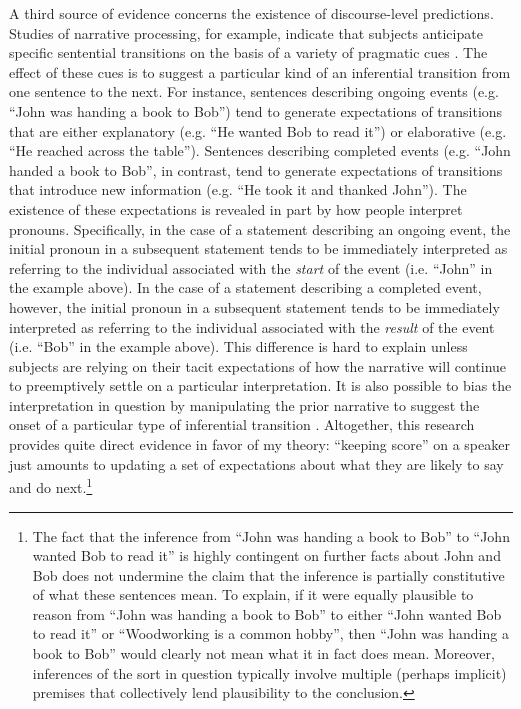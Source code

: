 A third source of evidence concerns the existence of discourse-level predictions. Studies of narrative processing, for example, indicate that subjects anticipate specific sentential transitions on the basis of a variety of pragmatic cues \citep{Rohde:2008}. The effect of these cues is to suggest a particular kind of an inferential transition from one sentence to the next. For instance, sentences describing ongoing events (e.g. ``John was handing a book to Bob'') tend to generate expectations of transitions that are either explanatory (e.g. ``He wanted Bob to read it'') or elaborative (e.g. ``He reached across the table''). Sentences describing completed events (e.g. ``John handed a book to Bob'', in contrast, tend to generate expectations of transitions that introduce new information (e.g. ``He took it and thanked John''). The existence of these expectations is revealed in part by how people interpret pronouns. Specifically, in the case of a statement describing an ongoing event, the initial pronoun in a subsequent statement tends to be immediately interpreted as referring to the individual associated with the \textit{start} of the event (i.e. ``John'' in the example above). In the case of a statement describing a completed event, however, the initial pronoun in a subsequent statement tends to be immediately interpreted as referring to the individual associated with the \textit{result} of the event (i.e. ``Bob'' in the example above). This difference is hard to explain unless subjects are relying on their tacit expectations of how the narrative will continue to preemptively settle on a particular interpretation. It is also possible to bias the interpretation in question by manipulating the prior narrative to suggest the onset of a particular type of inferential transition \citep{Rohde:2008}. Altogether, this research provides quite direct evidence in favor of my theory: ``keeping score'' on a speaker just amounts to updating a set of expectations about what they are likely to say and do next.\footnote{The fact that the inference from ``John was handing a book to Bob'' to ``John wanted Bob to read it'' is highly contingent on further facts about John and Bob does not undermine the claim that the inference is partially constitutive of what these sentences mean. To explain, if it were equally plausible to reason from ``John was handing a book to Bob'' to either ``John wanted Bob to read it'' or ``Woodworking is a common hobby'', then ``John was handing a book to Bob'' would clearly not mean what it in fact does mean. Moreover, inferences of the sort in question typically involve multiple (perhaps implicit) premises that collectively lend plausibility to the conclusion.}

